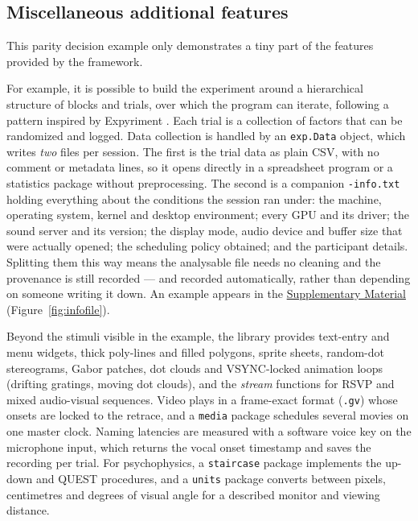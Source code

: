 \documentclass[doc,a4paper,floatsintext]{apa7}
\begin{document}
\subsection{Miscellaneous additional features}

This parity decision example only demonstrates a tiny part of the features
provided by the framework.

For example, it is possible to build the experiment around a
hierarchical structure of blocks and trials, over which the program
can iterate, following a pattern inspired by Expyriment
\parencite{krause2014}. Each trial is a collection of factors that can
be randomized and logged. Data collection is handled by an
\texttt{exp.Data} object, which writes \emph{two} files per session. The first
is the trial data as plain CSV, with no comment or metadata lines, so it opens
directly in a spreadsheet program or a statistics package without preprocessing.
The second is a companion \texttt{-info.txt} holding everything about the
conditions the session ran under: the machine, operating system, kernel and
desktop environment; every GPU and its driver; the sound server and its version;
the display mode, audio device and buffer size that were actually opened; the
scheduling policy obtained; and the participant details. Splitting them this way
means the analysable file needs no cleaning and the provenance is still
recorded --- and recorded automatically, rather than depending on someone
writing it down. An example appears in the
\hyperref[app:timing]{Supplementary Material} (Figure~\ref{fig:infofile}).

Beyond the stimuli visible in the example, the library provides
text-entry and menu widgets, thick poly-lines and filled polygons,
sprite sheets, random-dot stereograms, Gabor patches, dot clouds and
VSYNC-locked animation loops (drifting gratings, moving dot clouds),
and the \emph{stream} functions for RSVP and mixed audio-visual
sequences. Video plays in a frame-exact format (\texttt{.gv}) whose
onsets are locked to the retrace, and a \texttt{media} package
schedules several movies on one master clock. Naming latencies are
measured with a software voice key on the microphone input, which
returns the vocal onset timestamp and saves the recording per trial.
For psychophysics, a \texttt{staircase} package implements the
up-down \parencite{levitt1971} and QUEST \parencite{watson1983}
procedures, and a \texttt{units} package converts between pixels,
centimetres and degrees of visual angle for a described monitor and
viewing distance.
\end{document}
